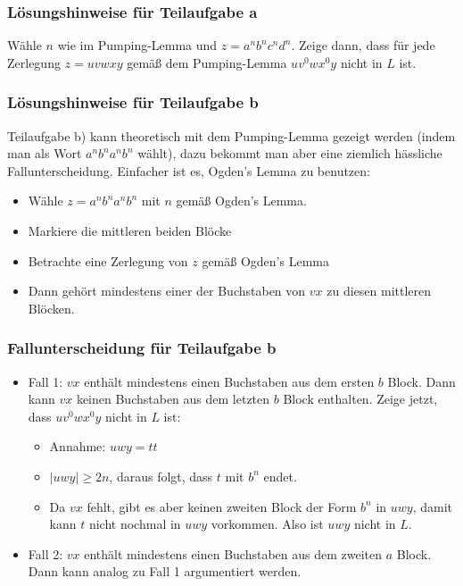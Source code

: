 \documentclass{beamer}
\begin{document}
{\begin{frame}
\frametitle{Lösungshinweise für Teilaufgabe a}
 Wähle $n$ wie im Pumping-Lemma und $z=a^nb^nc^nd^n$. 
 Zeige dann, dass für jede Zerlegung $z=uvwxy$ gemäß dem Pumping-Lemma $uv^0wx^0y$ nicht in $L$ ist.
\end{frame}
\begin{frame}
 \frametitle{Lösungshinweise für Teilaufgabe b}      
 Teilaufgabe b) kann theoretisch mit dem Pumping-Lemma gezeigt werden (indem man als Wort $a^nb^na^nb^n$ wählt), dazu bekommt man aber eine ziemlich hässliche Fallunterscheidung.
       Einfacher ist es, Ogden's Lemma zu benutzen: 
       \begin{itemize}
        \item Wähle $z=a^nb^na^nb^n$ mit $n$ gemäß Ogden's Lemma.              
        \item Markiere die mittleren beiden Blöcke
        \item Betrachte eine Zerlegung von $z$ gemäß Ogden's Lemma
        \item Dann gehört mindestens einer der Buchstaben von $vx$ zu diesen mittleren Blöcken.
        \end{itemize}
\end{frame}
\begin{frame}
\frametitle{Fallunterscheidung für Teilaufgabe b}
\begin{itemize}
        \item Fall 1: $vx$ enthält mindestens einen Buchstaben aus dem ersten $b$ Block. 
              Dann kann $vx$ keinen Buchstaben aus dem letzten $b$ Block enthalten. 
              Zeige jetzt, dass $uv^0wx^0y$ nicht in $L$ ist: 
              \begin{itemize}
                \item Annahme: $uwy=tt$
                \item $|uwy| \geq 2n$, daraus folgt, dass $t$ mit $b^n$ endet.
                \item Da $vx$ fehlt, gibt es aber keinen zweiten Block der Form $b^n$ in $uwy$, damit kann $t$ nicht nochmal in $uwy$ vorkommen.
                      Also ist $uwy$ nicht in $L$.
              \end{itemize}
        \item Fall 2: $vx$ enthält mindestens einen Buchstaben aus dem zweiten $a$ Block. 
              Dann kann analog zu Fall 1 argumentiert werden. 
       \end{itemize}
\end{frame}

}
\end{document}
